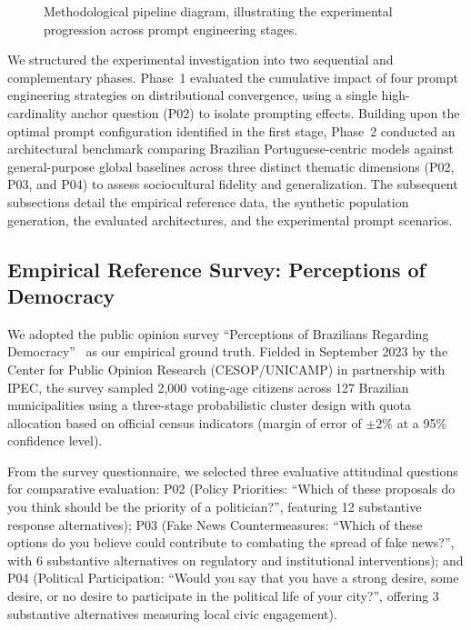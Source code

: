 \begin{figure}[htbp]
    \centering
    
    \caption{Methodological pipeline diagram, illustrating the experimental
        progression across prompt engineering stages.}
    \label{fig:pipeline}
\end{figure}

We structured the experimental investigation into two sequential and
complementary phases. Phase~1 evaluated the cumulative impact of four
prompt engineering strategies on distributional convergence, using a single
high-cardinality anchor question (P02) to isolate prompting effects.
Building upon the optimal prompt configuration identified in the first stage,
Phase~2 conducted an architectural benchmark comparing Brazilian
Portuguese-centric models against general-purpose global baselines across three
distinct thematic dimensions (P02, P03, and P04) to assess sociocultural fidelity
and generalization. The subsequent subsections detail the empirical reference
data, the synthetic population generation, the evaluated architectures, and
the experimental prompt scenarios.

\subsection{Empirical Reference Survey: Perceptions of Democracy}
\label{subsec:database}

We adopted the public opinion survey ``Perceptions of Brazilians Regarding
Democracy''~\cite{cesop04832} as our empirical ground truth. Fielded in September
2023 by the Center for Public Opinion Research (CESOP/UNICAMP) in partnership
with IPEC, the survey sampled 2,000 voting-age citizens across 127 Brazilian
municipalities using a three-stage probabilistic cluster design with quota
allocation based on official census indicators (margin of error of $\pm 2\%$ at a
95\% confidence level).

From the survey questionnaire, we selected three evaluative attitudinal
questions for comparative evaluation: P02 (Policy Priorities: ``Which of
these proposals do you think should be the priority of a politician?'',
featuring 12 substantive response alternatives); P03 (Fake News
Countermeasures: ``Which of these options do you believe could contribute to
combating the spread of fake news?'', with 6 substantive alternatives on regulatory and
institutional interventions); and P04 (Political Participation: ``Would you
say that you have a strong desire, some desire, or no desire to participate in
the political life of your city?'', offering 3 substantive alternatives measuring local civic
engagement).

